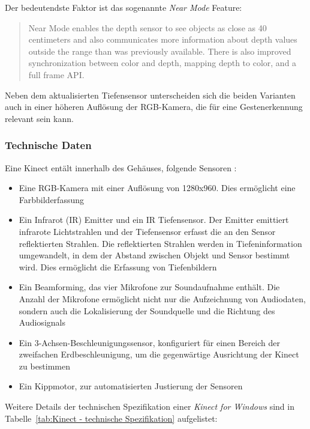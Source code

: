Der bedeutendste Faktor ist das sogenannte \textit{Near Mode} Feature:
\begin{quote}
Near Mode enables the depth sensor to see objects as close as 40 centimeters and also communicates more information about depth values outside the range than was previously available. There is also improved synchronization between color and depth, mapping depth to color, and a full frame API. \footnotemark[6]
\end{quote}
Neben dem aktualisierten Tiefensensor unterscheiden sich die beiden Varianten auch in einer h\"oheren Aufl\"osung der RGB-Kamera, die f\"ur eine Gestenerkennung relevant sein kann.

\subsubsection{Technische Daten}
Eine Kinect ent\"alt innerhalb des Geh\"auses, folgende Sensoren \footnotemark[1]:
\begin{itemize}
  \item Eine RGB-Kamera mit einer Aufl\"osung von 1280x960.
  Dies erm\"oglicht eine Farbbilderfassung
  \item Ein Infrarot (IR) Emitter und ein IR Tiefensensor.
  Der Emitter emittiert infrarote Lichtstrahlen und der Tiefensensor erfasst die an den Sensor reflektierten Strahlen.
  Die reflektierten Strahlen werden in Tiefeninformation umgewandelt, in dem der Abstand zwischen Objekt und Sensor bestimmt wird.
  Dies erm\"oglicht die Erfassung von Tiefenbildern
  \item Ein \gls{Beamforming}, das vier Mikrofone zur Soundaufnahme enth\"alt. Die Anzahl der Mikrofone erm\"oglicht nicht nur die Aufzeichnung von Audiodaten,
  sondern auch die Lokalisierung der Soundquelle und die Richtung des Audiosignals
  \item Ein 3-Achsen-Beschleunigungssensor, konfiguriert f\"ur einen Bereich der zweifachen Erdbeschleunigung, um die gegenw\"artige Ausrichtung der Kinect zu bestimmen
  \item Ein Kippmotor, zur automatisierten Justierung der Sensoren
\end{itemize}

Weitere Details der technischen Spezifikation einer \textit{Kinect for Windows} sind in Tabelle~\ref{tab:Kinect - technische Spezifikation} aufgelistet:

